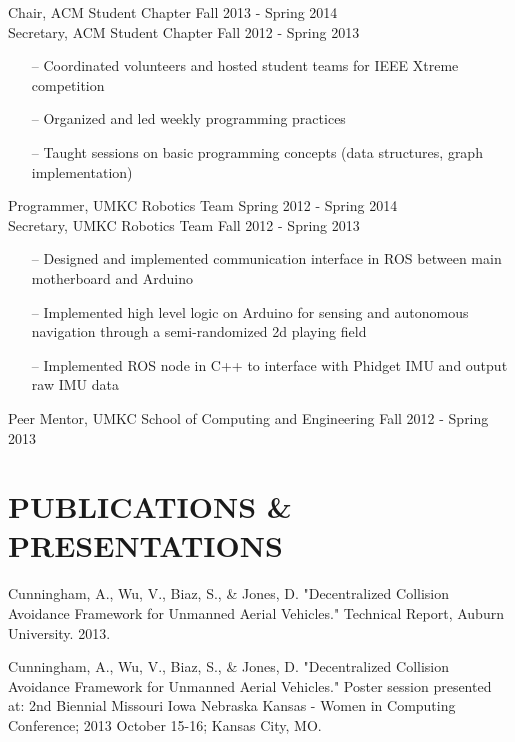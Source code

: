 \documentclass[line,margin]{res}
\begin{document}
\begin{resume}
		
		Chair, ACM Student Chapter \hfill Fall 2013 - Spring 2014\\
		Secretary, ACM Student Chapter \hfill Fall 2012 - Spring 2013 
		         \begin{itemize} [leftmargin=5mm]  \itemsep -2pt %
                 \item[--] Coordinated volunteers and hosted student teams for IEEE Xtreme competition 
                 \item[--] Organized and led weekly programming practices
                 \item[--] Taught sessions on basic programming concepts (data structures, graph implementation)
                 \end{itemize} 

		
		Programmer, UMKC Robotics Team \hfill Spring 2012 - Spring 2014\\ 
		Secretary, UMKC Robotics Team \hfill  Fall 2012 - Spring 2013 	
		\begin{itemize} [leftmargin=5mm]  \itemsep -2pt %
                 \item[--] Designed and implemented communication interface in ROS between main motherboard and Arduino 
				 \item[--] Implemented high level logic on Arduino for sensing and autonomous navigation through a semi-randomized 2d playing field
                 \item[--] Implemented ROS node in C++ to interface with Phidget IMU and output raw IMU data
                 \end{itemize} 
		
		Peer Mentor, UMKC School of Computing and Engineering \hfill Fall 2012 - Spring 2013 

\section{PUBLICATIONS \& PRESENTATIONS }

\hangindent=0.7cm Cunningham, A., Wu, V., Biaz, S., \& Jones, D. "Decentralized Collision Avoidance Framework for Unmanned Aerial Vehicles." Technical Report, Auburn University. 2013.

\hangindent=0.7cm Cunningham, A., Wu, V., Biaz, S., \& Jones, D. "Decentralized Collision Avoidance Framework for Unmanned Aerial Vehicles." Poster session presented at: 2nd Biennial Missouri Iowa Nebraska Kansas - Women in Computing Conference; 2013 October 15-16; Kansas City, MO.
		


\end{resume}
\end{document}
